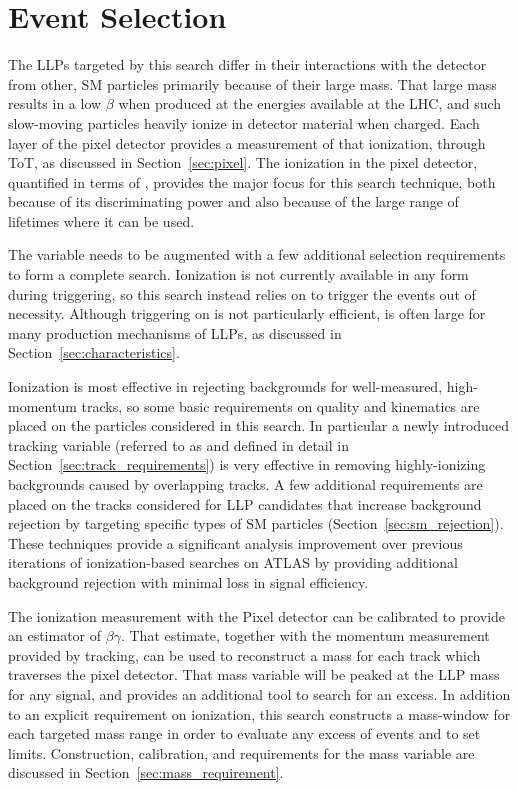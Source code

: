 \chapter{Event Selection}

\label{ch:selection}

The \acp{LLP} targeted by this search differ in their interactions with the detector from other, \ac{SM} particles primarily because of their large mass. 
That large mass results in a low $\beta$ when produced at the energies available at the \ac{LHC}, and such slow-moving particles heavily ionize in detector material when charged. 
Each layer of the pixel detector provides a measurement of that ionization, through \ac{ToT}, as discussed in Section~\ref{sec:pixel}. 
The ionization in the pixel detector, quantified in terms of \dedx, provides the major focus for this search technique, both because of its discriminating power and also because of the large range of lifetimes where it can be used.

The \dedx variable needs to be augmented with a few additional selection requirements to form a complete search. 
Ionization is not currently available in any form during triggering, so this search instead relies on \met to trigger the events out of necessity. 
Although triggering on \met is not particularly efficient, \met is often large for many production mechanisms of \acp{LLP}, as discussed in Section~\ref{sec:characteristics}.

Ionization is most effective in rejecting backgrounds for well-measured, high-momentum tracks, so some basic requirements on quality and kinematics are placed on the particles considered in this search. 
In particular a newly introduced tracking variable (referred to as \Nss and defined in detail in Section~\ref{sec:track_requirements}) is very effective in removing highly-ionizing backgrounds caused by overlapping tracks. 
A few additional requirements are placed on the tracks considered for \ac{LLP} candidates that increase background rejection by targeting specific types of \ac{SM} particles (Section~\ref{sec:sm_rejection}). 
These techniques provide a significant analysis improvement over previous iterations of ionization-based searches on ATLAS by providing additional background rejection with minimal loss in signal efficiency. 

The ionization measurement with the Pixel detector can be calibrated to provide an estimator of $\beta\gamma$. That estimate, together with the momentum measurement provided by tracking, can be used to reconstruct a mass for each track which traverses the pixel detector. 
That mass variable will be peaked at the \ac{LLP} mass for any signal, and provides an additional tool to search for an excess.
In addition to an explicit requirement on ionization, this search constructs a mass-window for each targeted mass range in order to evaluate any excess of events and to set limits. 
Construction, calibration, and requirements for the mass variable are discussed in Section~\ref{sec:mass_requirement}.


